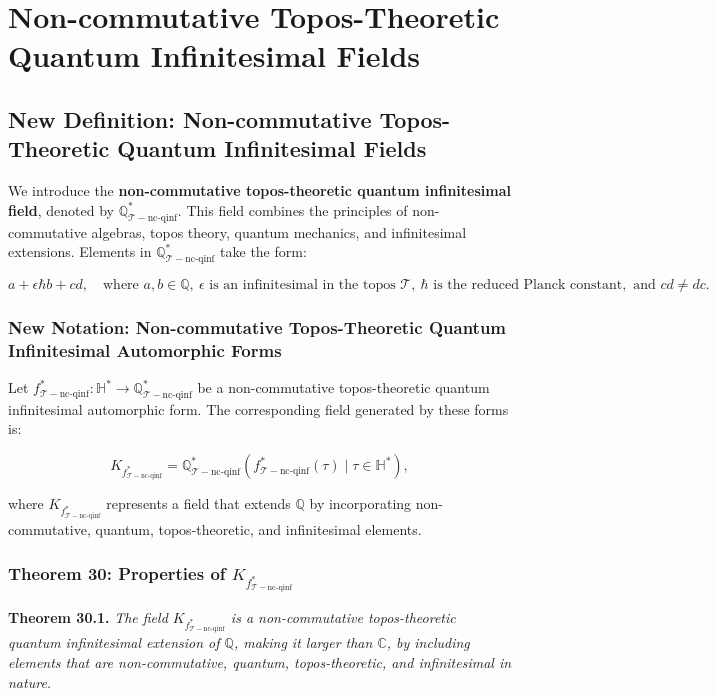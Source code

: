 \documentclass{article}
\begin{document}

\section{Non-commutative Topos-Theoretic Quantum Infinitesimal Fields}
\subsection{New Definition: Non-commutative Topos-Theoretic Quantum Infinitesimal Fields}
We introduce the \textbf{non-commutative topos-theoretic quantum infinitesimal field}, denoted by \(\mathbb{Q}_{\mathcal{T}-\text{nc-qinf}}^*\). This field combines the principles of non-commutative algebras, topos theory, quantum mechanics, and infinitesimal extensions. Elements in \(\mathbb{Q}_{\mathcal{T}-\text{nc-qinf}}^*\) take the form:

\[
a + \epsilon \hbar b + cd, \quad \text{where } a, b \in \mathbb{Q}, \ \epsilon \text{ is an infinitesimal in the topos } \mathcal{T}, \ \hbar \text{ is the reduced Planck constant}, \text{ and } cd \neq dc.
\]

\subsubsection{New Notation: Non-commutative Topos-Theoretic Quantum Infinitesimal Automorphic Forms}
Let \(f_{\mathcal{T}-\text{nc-qinf}}^*: \mathbb{H}^* \to \mathbb{Q}_{\mathcal{T}-\text{nc-qinf}}^*\) be a non-commutative topos-theoretic quantum infinitesimal automorphic form. The corresponding field generated by these forms is:

\[
K_{f_{\mathcal{T}-\text{nc-qinf}}^*} = \mathbb{Q}_{\mathcal{T}-\text{nc-qinf}}^*(f_{\mathcal{T}-\text{nc-qinf}}^*(\tau) \mid \tau \in \mathbb{H}^*),
\]

where \(K_{f_{\mathcal{T}-\text{nc-qinf}}^*}\) represents a field that extends \(\mathbb{Q}\) by incorporating non-commutative, quantum, topos-theoretic, and infinitesimal elements.

\subsubsection{Theorem 30: Properties of \(K_{f_{\mathcal{T}-\text{nc-qinf}}^*}\)}
\textbf{Theorem 30.1.} \textit{The field \(K_{f_{\mathcal{T}-\text{nc-qinf}}^*}\) is a non-commutative topos-theoretic quantum infinitesimal extension of \(\mathbb{Q}\), making it larger than \(\mathbb{C}\), by including elements that are non-commutative, quantum, topos-theoretic, and infinitesimal in nature.}
\end{document}
